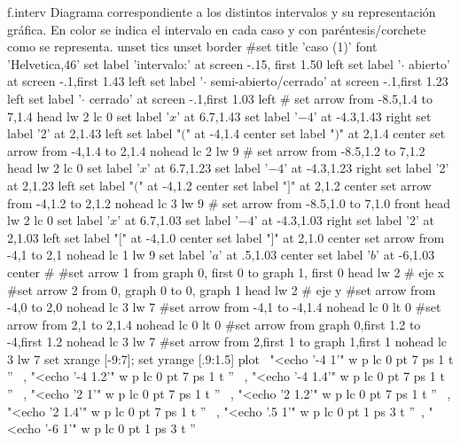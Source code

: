 \begin{plot}{.9}{f.interv}
  {Diagrama correspondiente a los distintos intervalos y su representación
  gráfica. En color se indica el intervalo en cada caso y con
  paréntesis/corchete como se representa.
  }
  unset tics
  unset border
  #set title 'caso (1)' font 'Helvetica,46'
  set label 'intervalo:' at screen -.15, first 1.50 left
  set label '$\cdot$ abierto' at screen -.1,first 1.43 left
  set label '$\cdot$ semi-abierto/cerrado' at screen -.1,first 1.23 left
  set label '$\cdot$ cerrado' at screen -.1,first 1.03 left
  #
  set arrow from -8.5,1.4 to 7,1.4 head lw 2 lc 0
  set label '$x$' at 6.7,1.43
  set label '$-4$' at -4.3,1.43 right
  set label '2' at 2,1.43 left
  set label  "$($" at -4,1.4 center
  set label  "$)$" at 2,1.4 center
  set arrow from -4,1.4 to 2,1.4 nohead lc 2 lw 9
  #
  set arrow from -8.5,1.2 to 7,1.2 head lw 2 lc 0
  set label '$x$' at 6.7,1.23
  set label '$-4$' at -4.3,1.23 right
  set label '2' at 2,1.23 left
  set label  "$($" at -4,1.2 center
  set label  "$]$" at 2,1.2 center
  set arrow from -4,1.2 to 2,1.2 nohead lc 3 lw 9
  #
  set arrow from -8.5,1.0 to 7,1.0 front head lw 2 lc 0
  set label '$x$' at 6.7,1.03
  set label '$-4$' at -4.3,1.03 right
  set label '2' at 2,1.03 left
  set label  "$[$" at -4,1.0 center
  set label  "$]$" at 2,1.0 center
  set arrow from -4,1 to 2,1 nohead lc 1 lw 9
  set label '$a$'  at .5,1.03 center
  set label '$b$'  at -6,1.03 center
  #
  #set arrow 1 from graph 0, first 0 to graph 1, first 0 head lw 2 # eje x
  #set arrow 2 from 0, graph 0 to 0, graph 1 head lw 2	      # eje y 
  #set arrow from -4,0 to 2,0 nohead lc 3 lw 7
  #set arrow from -4,1 to -4,1.4 nohead lc 0 lt 0
  #set arrow from 2,1 to 2,1.4 nohead lc 0 lt 0
  #set arrow from graph 0,first 1.2 to -4,first 1.2 nohead lc 3 lw 7
  #set arrow from 2,first 1 to graph 1,first 1 nohead lc 3 lw 7
  set xrange [-9:7]; set yrange [.9:1.5]
  plot \
  "<echo '-4 1'" w p lc 0 pt 7 ps 1 t '' \
  , "<echo '-4 1.2'" w p lc 0 pt 7 ps 1 t '' \
  , "<echo '-4 1.4'" w p lc 0 pt 7 ps 1 t '' \
  , "<echo '2 1'" w p lc 0 pt 7 ps 1 t '' \
  , "<echo '2 1.2'" w p lc 0 pt 7 ps 1 t '' \
  , "<echo '2 1.4'" w p lc 0 pt 7 ps 1 t '' \
  , "<echo '.5 1'" w p lc 0 pt 1 ps 3 t ''\
  , "<echo '-6 1'" w p lc 0 pt 1 ps 3 t ''\
\end{plot}

